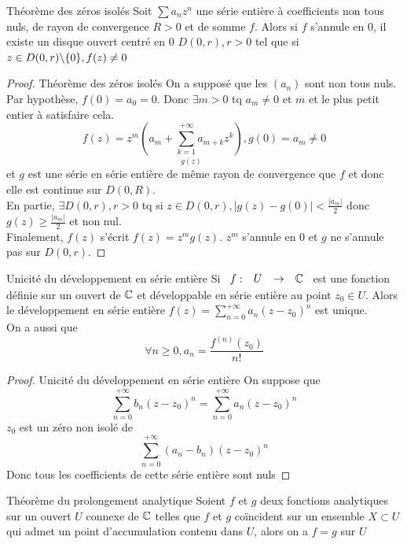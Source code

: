 \documentclass[]{report}
\begin{document}
\begin{tm}{Théorème des zéros isolés}{}
    Soit $\sum a_nz^n$ une série entière à coefficients non tous nuls, de rayon de convergence $R>0$ et de somme $f$. Alors si $f$ s'annule en $0$, il existe un disque ouvert centré en $0$ $D(0,r),r>0$ tel que si $z\in D(0,r)\backslash \{0\},f(z)\neq 0$
\end{tm}

\begin{proof}{Théorème des zéros isolés}{}
    On a supposé que les $(a_n)$ sont non tous nuls. Par hypothèse, $f(0)=a_0=0$. Donc $\exists m>0$ tq $a_m\neq 0$ et $m$ et le plus petit entier à satisfaire cela.
    \[f(z)=z^m\underset{g(z)}{\left(a_m+\sum_{k=1}^{+\infty}a_{m+k}z^k\right)}, g(0)=a_m\neq 0\]
    et $g $ est une série en série entière de même rayon de convergence que $f$ et donc elle est continue sur $D(0,R)$.\\
    En partie, $\exists D(0,r),r>0$ tq si $z\in D(0,r),\left|g(z)-g(0)\right|<\frac{|a_m|}{2}$ donc $g(z)\ge \frac{|a_m|}{2}$ et non nul.\\
    Finalement, $f(z)$ s'écrit $f(z)=z^{m}g(z)$. $z^m$ s'annule en $0$ et $g$ ne s'annule pas sur $D(0,r)$.
\end{proof}

\begin{tm}{Unicité du développement en série entière}{}
    Si $\begin{array}{ccccc} f : & U & \to & \mathbb{C} \end{array}$ est une fonction définie sur un ouvert de $\mathbb{C}$ et développable en série entière au point $z_0\in U$. Alors le développement en série entière $f(z)=\sum_{n=0}^{+\infty} a_n (z-z_0)^n$ est unique.\\
    On a aussi que
    \[\forall n\ge 0, a_n=\frac{f^{(n)}(z_0)}{n!}\]
\end{tm}

\begin{proof}{Unicité du développement en série entière}{}
    On suppose que
    \[\sum_{n=0}^{+\infty}b_n(z-z_0)^n=\sum_{n=0}^{+\infty} a_n (z-z_0)^n\]
    $z_0$ est un zéro non isolé de
    \[\sum_{n=0}^{+\infty}(a_n-b_n)(z-z_0)^n\]
    Donc tous les coefficients de cette série entière sont nuls
\end{proof}

\begin{tm}{Théorème du prolongement analytique}{}
    Soient $f$ et $g$ deux fonctions analytiques sur un ouvert $U$ connexe de $\mathbb{C}$ telles que $f$ et $g$ coïncident sur un ensemble $X\subset U$ qui admet un point d'accumulation contenu dans $U$, alors on a $f=g$ sur $U$
\end{tm}
\end{document}
